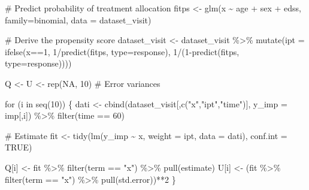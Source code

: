 \documentclass[
  letterpaper,
  DIV=11,
  numbers=noendperiod]{scrreprt}
\newenvironment{Shaded}{\begin{snugshade}}{\end{snugshade}}
\newcommand{\AttributeTok}[1]{\textcolor[rgb]{0.40,0.45,0.13}{#1}}
\newcommand{\CommentTok}[1]{\textcolor[rgb]{0.37,0.37,0.37}{#1}}
\newcommand{\ConstantTok}[1]{\textcolor[rgb]{0.56,0.35,0.01}{#1}}
\newcommand{\ControlFlowTok}[1]{\textcolor[rgb]{0.00,0.23,0.31}{#1}}
\newcommand{\DecValTok}[1]{\textcolor[rgb]{0.68,0.00,0.00}{#1}}
\newcommand{\FunctionTok}[1]{\textcolor[rgb]{0.28,0.35,0.67}{#1}}
\newcommand{\NormalTok}[1]{\textcolor[rgb]{0.00,0.23,0.31}{#1}}
\newcommand{\OtherTok}[1]{\textcolor[rgb]{0.00,0.23,0.31}{#1}}
\newcommand{\SpecialCharTok}[1]{\textcolor[rgb]{0.37,0.37,0.37}{#1}}
\newcommand{\StringTok}[1]{\textcolor[rgb]{0.13,0.47,0.30}{#1}}
\begin{document}
\begin{Shaded}
\begin{Highlighting}[]
\CommentTok{\# Predict probability of treatment allocation}
\NormalTok{fitps }\OtherTok{\textless{}{-}} \FunctionTok{glm}\NormalTok{(x }\SpecialCharTok{\textasciitilde{}}\NormalTok{ age }\SpecialCharTok{+}\NormalTok{ sex }\SpecialCharTok{+}\NormalTok{ edss, }\AttributeTok{family=}\StringTok{\textquotesingle{}binomial\textquotesingle{}}\NormalTok{, }\AttributeTok{data =}\NormalTok{ dataset\_visit)}
  
\CommentTok{\# Derive the propensity score}
\NormalTok{dataset\_visit }\OtherTok{\textless{}{-}}\NormalTok{ dataset\_visit }\SpecialCharTok{\%\textgreater{}\%} \FunctionTok{mutate}\NormalTok{(}\AttributeTok{ipt =} \FunctionTok{ifelse}\NormalTok{(x}\SpecialCharTok{==}\DecValTok{1}\NormalTok{, }\DecValTok{1}\SpecialCharTok{/}\FunctionTok{predict}\NormalTok{(fitps, }\AttributeTok{type=}\StringTok{\textquotesingle{}response\textquotesingle{}}\NormalTok{),}
                                                       \DecValTok{1}\SpecialCharTok{/}\NormalTok{(}\DecValTok{1}\SpecialCharTok{{-}}\FunctionTok{predict}\NormalTok{(fitps, }\AttributeTok{type=}\StringTok{\textquotesingle{}response\textquotesingle{}}\NormalTok{))))}
  
\NormalTok{Q }\OtherTok{\textless{}{-}}\NormalTok{ U }\OtherTok{\textless{}{-}} \FunctionTok{rep}\NormalTok{(}\ConstantTok{NA}\NormalTok{, }\DecValTok{10}\NormalTok{) }\CommentTok{\# Error variances}

\ControlFlowTok{for}\NormalTok{ (i }\ControlFlowTok{in} \FunctionTok{seq}\NormalTok{(}\DecValTok{10}\NormalTok{)) \{}
\NormalTok{  dati }\OtherTok{\textless{}{-}} \FunctionTok{cbind}\NormalTok{(dataset\_visit[,}\FunctionTok{c}\NormalTok{(}\StringTok{"x"}\NormalTok{,}\StringTok{"ipt"}\NormalTok{,}\StringTok{"time"}\NormalTok{)], }\AttributeTok{y\_imp =}\NormalTok{ imp[,i]) }\SpecialCharTok{\%\textgreater{}\%} \FunctionTok{filter}\NormalTok{(time }\SpecialCharTok{==} \DecValTok{60}\NormalTok{)}
  
  \CommentTok{\# Estimate }
\NormalTok{  fit }\OtherTok{\textless{}{-}} \FunctionTok{tidy}\NormalTok{(}\FunctionTok{lm}\NormalTok{(y\_imp }\SpecialCharTok{\textasciitilde{}}\NormalTok{ x, }\AttributeTok{weight =}\NormalTok{ ipt, }\AttributeTok{data =}\NormalTok{ dati), }\AttributeTok{conf.int =} \ConstantTok{TRUE}\NormalTok{) }
  
\NormalTok{  Q[i] }\OtherTok{\textless{}{-}}\NormalTok{ fit }\SpecialCharTok{\%\textgreater{}\%} \FunctionTok{filter}\NormalTok{(term }\SpecialCharTok{==} \StringTok{"x"}\NormalTok{) }\SpecialCharTok{\%\textgreater{}\%} \FunctionTok{pull}\NormalTok{(estimate)}
\NormalTok{  U[i] }\OtherTok{\textless{}{-}}\NormalTok{ (fit }\SpecialCharTok{\%\textgreater{}\%} \FunctionTok{filter}\NormalTok{(term }\SpecialCharTok{==} \StringTok{"x"}\NormalTok{) }\SpecialCharTok{\%\textgreater{}\%} \FunctionTok{pull}\NormalTok{(std.error))}\SpecialCharTok{**}\DecValTok{2}
\NormalTok{\}}


\end{Highlighting}
\end{Shaded}
\end{document}
